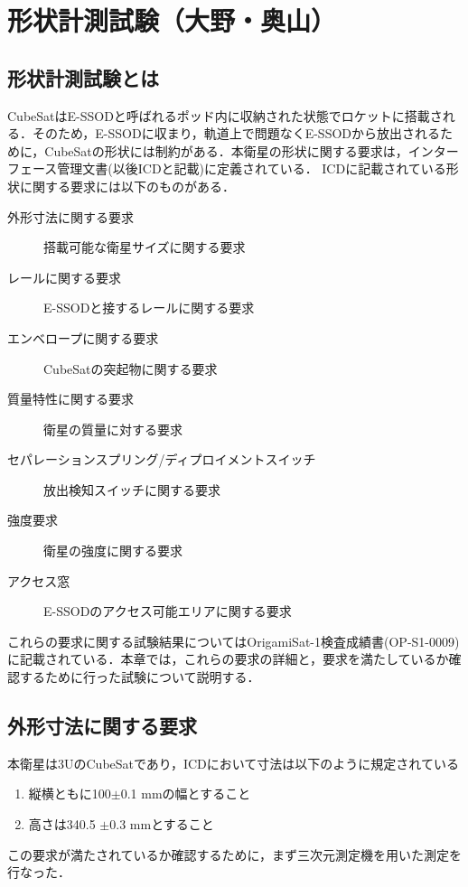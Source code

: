 \section{形状計測試験（大野・奥山）}

\subsection{形状計測試験とは}

CubeSatはE-SSODと呼ばれるポッド内に収納された状態でロケットに搭載される．そのため，E-SSODに収まり，軌道上で問題なくE-SSODから放出されるために，CubeSatの形状には制約がある．本衛星の形状に関する要求は，インターフェース管理文書(以後ICDと記載)に定義されている．
ICDに記載されている形状に関する要求には以下のものがある．
\begin{description}
	\item[外形寸法に関する要求] 搭載可能な衛星サイズに関する要求
	\item[レールに関する要求] E-SSODと接するレールに関する要求
	\item[エンベロープに関する要求] CubeSatの突起物に関する要求
	\item[質量特性に関する要求] 衛星の質量に対する要求
	\item[セパレーションスプリング/ディプロイメントスイッチ] 放出検知スイッチに関する要求
	\item[強度要求] 衛星の強度に関する要求
	\item[アクセス窓] E-SSODのアクセス可能エリアに関する要求
\end{description}

これらの要求に関する試験結果についてはOrigamiSat-1検査成績書(OP-S1-0009)に記載されている．本章では，これらの要求の詳細と，要求を満たしているか確認するために行った試験について説明する．

\subsection{外形寸法に関する要求}

本衛星は3UのCubeSatであり，ICDにおいて寸法は以下のように規定されている

\begin{enumerate}
	\item 縦横ともに100$\pm$0.1 mmの幅とすること
	\item 高さは340.5 $\pm$0.3 mmとすること
\end{enumerate}

この要求が満たされているか確認するために，まず三次元測定機を用いた測定を行なった．

